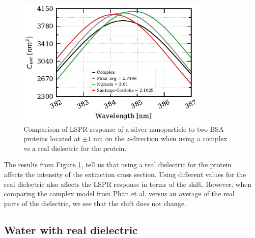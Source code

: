 \begin{figure} %
    \centering
    \includegraphics[width=0.85\textwidth]{bsa_diel_study.pdf} 
    \caption{Comparison of LSPR response of a silver nanoparticle to two BSA proteins located at $\pm1$ nm on the $z$-direction
    when using a complex vs a real dielectric for the protein.}
    \label{fig:bsa_diel}
 \end{figure}

The results from Figure \ref{fig:bsa_diel}, tell us that using a real dielectric for the protein affects the intensity of the extinction cross section. Using 
different values for the real dielectric also affects the LSPR response in terms of the shift. However, when comparing the complex model from Phan et al. versus
an average of the real parts of the dielectric, we see that the shift does not change. 

\subsection{Water with real dielectric}

